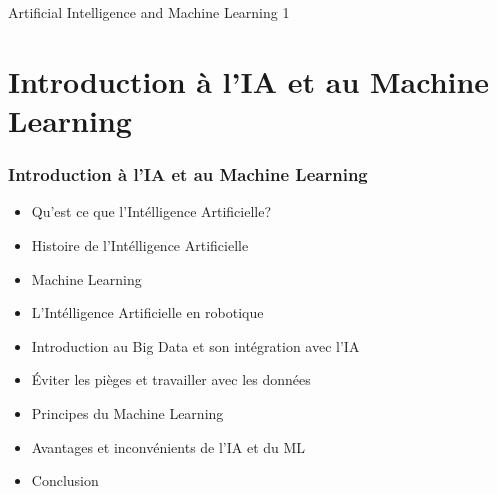 \documentclass{beamer}
\begin{document}
{
\begin{frame}[plain]{Artificial Intelligence and Machine Learning 1}
\end{frame}
}	%

	\section{Introduction à l'IA et au Machine Learning}
\begin{frame}
	\frametitle{Introduction à l'IA et au Machine Learning}
	\begin{itemize}
		\item Qu'est ce que l'Intélligence Artificielle?
		\item Histoire de l'Intélligence Artificielle
		\item Machine Learning
		\item L'Intélligence Artificielle en robotique
		\item Introduction au Big Data et son intégration avec l'IA
		\item Éviter les pièges et travailler avec les données
		\item Principes du Machine Learning
		\item Avantages et inconvénients de l'IA et du ML
		\item Conclusion 
	\end{itemize}
\end{frame}
\end{document}
